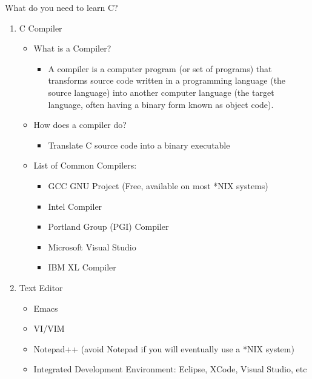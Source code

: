 \documentclass[10pt,t]{beamer}
\begin{document}
\begin{frame}{What do you need to learn C?}
  \begin{enumerate}
    \item {C Compiler}
      \begin{itemize}
        \item What is a Compiler?
          \begin{itemize}
            \item A compiler is a computer program (or set of programs) that transforms source code written in a programming language (the source language) into another computer language (the target language, often having a binary form known as object code).
          \end{itemize}
        \item How does a compiler do?
          \begin{itemize}
            \item Translate C source code into a binary executable
          \end{itemize}
        \item List of Common Compilers:
          \begin{itemize}
            \item GCC GNU Project (Free, available on most *NIX systems)
            \item Intel Compiler
            \item Portland Group (PGI) Compiler
            \item Microsoft Visual Studio
            \item IBM XL Compiler
          \end{itemize}
      \end{itemize}
    \item {Text Editor}
      \begin{itemize}
        \item Emacs
        \item VI/VIM
        \item Notepad++ (avoid Notepad if you will eventually use a *NIX system)
        \item Integrated Development Environment: Eclipse, XCode, Visual Studio, etc
      \end{itemize}
  \end{enumerate}
\end{frame}
\end{document}
